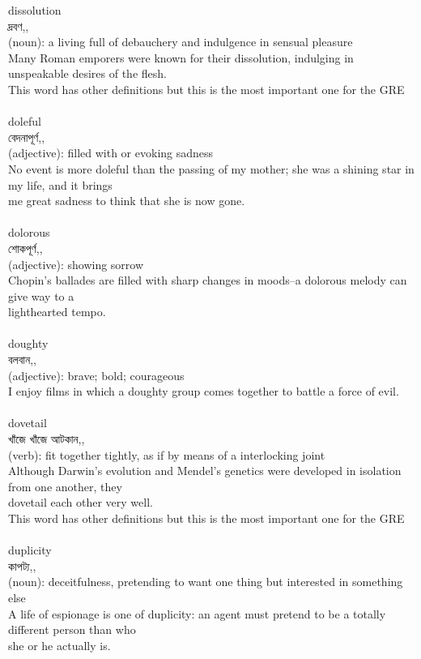 \documentclass{article}
\begin{document}
{dissolution}\\
{দ্রবণ,,}\\
{(noun): a living full of debauchery and indulgence in sensual pleasure\\Many Roman emporers were known for their dissolution, indulging in unspeakable desires of the flesh.\\This word has other definitions but this is the most important one for the GRE\\}\\
{doleful}\\
{বেদনাপূর্ণ,,}\\
{(adjective): filled with or evoking sadness\\No event is more doleful than the passing of my mother; she was a shining star in my life, and it brings\\me great sadness to think that she is now gone.\\}\\
{dolorous}\\
{শোকপূর্ণ,,}\\
{(adjective): showing sorrow\\Chopin's ballades are filled with sharp changes in moods--a dolorous melody can give way to a\\lighthearted tempo.\\}\\
{doughty}\\
{বলবান,,}\\
{(adjective): brave; bold; courageous\\I enjoy films in which a doughty group comes together to battle a force of evil.\\}\\
{dovetail}\\
{খাঁজে খাঁজে আটকান,,}\\
{(verb): fit together tightly, as if by means of a interlocking joint\\Although Darwin's evolution and Mendel's genetics were developed in isolation from one another, they\\dovetail each other very well.\\This word has other definitions but this is the most important one for the GRE\\}\\
{duplicity}\\
{কাপট্য,,}\\
{(noun): deceitfulness, pretending to want one thing but interested in something else\\A life of espionage is one of duplicity: an agent must pretend to be a totally different person than who\\she or he actually is.\\}\\
\end{document}
